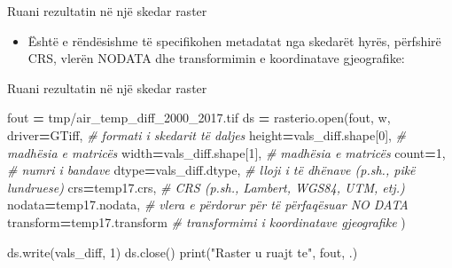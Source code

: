 \documentclass[
  ignorenonframetext,
]{beamer}
\newenvironment{Shaded}{\begin{snugshade}}{\end{snugshade}}
\newcommand{\BuiltInTok}[1]{#1}
\newcommand{\CommentTok}[1]{\textcolor[rgb]{0.56,0.35,0.01}{\textit{#1}}}
\newcommand{\DecValTok}[1]{\textcolor[rgb]{0.00,0.00,0.81}{#1}}
\newcommand{\NormalTok}[1]{#1}
\newcommand{\OperatorTok}[1]{\textcolor[rgb]{0.81,0.36,0.00}{\textbf{#1}}}
\newcommand{\StringTok}[1]{\textcolor[rgb]{0.31,0.60,0.02}{#1}}
\providecommand{\tightlist}{%
  \setlength{\itemsep}{0pt}\setlength{\parskip}{0pt}}
\begin{document}
\begin{frame}{Ruani rezultatin në një skedar raster}
\protect\hypertarget{ruani-rezultatin-nuxeb-njuxeb-skedar-raster}{}
\begin{itemize}
\tightlist
\item
  Është e rëndësishme të specifikohen metadatat nga skedarët hyrës,
  përfshirë CRS, vlerën NODATA dhe transformimin e koordinatave
  gjeografike:
\end{itemize}
\end{frame}

\begin{frame}[fragile]{Ruani rezultatin në një skedar raster}
\protect\hypertarget{ruani-rezultatin-nuxeb-njuxeb-skedar-raster-1}{}

\begin{Shaded}
\begin{Highlighting}[]
\NormalTok{fout }\OperatorTok{=} \StringTok{\textquotesingle{}tmp/air\_temp\_diff\_2000\_2017.tif\textquotesingle{}}
\NormalTok{ds }\OperatorTok{=}\NormalTok{ rasterio.}\BuiltInTok{open}\NormalTok{(fout, }\StringTok{\textquotesingle{}w\textquotesingle{}}\NormalTok{,}
\NormalTok{    driver}\OperatorTok{=}\StringTok{\textquotesingle{}GTiff\textquotesingle{}}\NormalTok{, }\CommentTok{\# formati i skedarit të daljes}
\NormalTok{    height}\OperatorTok{=}\NormalTok{vals\_diff.shape[}\DecValTok{0}\NormalTok{], }\CommentTok{\# madhësia e matricës}
\NormalTok{    width}\OperatorTok{=}\NormalTok{vals\_diff.shape[}\DecValTok{1}\NormalTok{], }\CommentTok{\# madhësia e matricës}
\NormalTok{    count}\OperatorTok{=}\DecValTok{1}\NormalTok{, }\CommentTok{\# numri i bandave}
\NormalTok{    dtype}\OperatorTok{=}\NormalTok{vals\_diff.dtype, }\CommentTok{\# lloji i të dhënave (p.sh., pikë lundruese)}
\NormalTok{    crs}\OperatorTok{=}\NormalTok{temp17.crs, }\CommentTok{\# CRS (p.sh., Lambert, WGS84, UTM, etj.)}
\NormalTok{    nodata}\OperatorTok{=}\NormalTok{temp17.nodata, }\CommentTok{\# vlera e përdorur për të përfaqësuar NO DATA}
\NormalTok{    transform}\OperatorTok{=}\NormalTok{temp17.transform }\CommentTok{\# transformimi i koordinatave gjeografike}
\NormalTok{)}

\NormalTok{ds.write(vals\_diff, }\DecValTok{1}\NormalTok{)}
\NormalTok{ds.close()}
\BuiltInTok{print}\NormalTok{(}\StringTok{"Raster u ruajt te"}\NormalTok{, fout, }\StringTok{\textquotesingle{}.\textquotesingle{}}\NormalTok{)}
\end{Highlighting}
\end{Shaded}
\end{frame}
\end{document}
